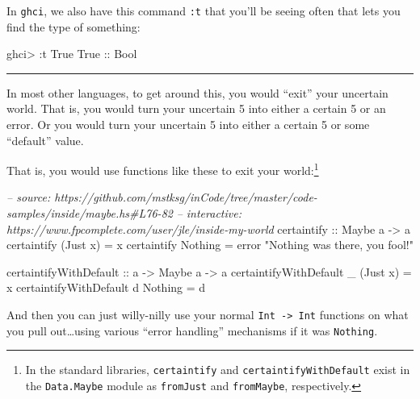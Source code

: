\documentclass[]{article}
\newenvironment{Shaded}{\begin{snugshade}}{\end{snugshade}}
\newcommand{\CommentTok}[1]{\textcolor[rgb]{0.56,0.35,0.01}{\textit{#1}}}
\newcommand{\DataTypeTok}[1]{\textcolor[rgb]{0.13,0.29,0.53}{#1}}
\newcommand{\FunctionTok}[1]{\textcolor[rgb]{0.00,0.00,0.00}{#1}}
\newcommand{\NormalTok}[1]{#1}
\newcommand{\OtherTok}[1]{\textcolor[rgb]{0.56,0.35,0.01}{#1}}
\newcommand{\StringTok}[1]{\textcolor[rgb]{0.31,0.60,0.02}{#1}}
\begin{document}
In \texttt{ghci}, we also have this command \texttt{:t} that you'll be seeing
often that lets you find the type of something:

\begin{Shaded}
\begin{Highlighting}[]
\NormalTok{ghci}\FunctionTok{>} \FunctionTok{:}\NormalTok{t }\DataTypeTok{True}
\DataTypeTok{True}\OtherTok{ ::} \DataTypeTok{Bool}
\end{Highlighting}
\end{Shaded}

\begin{center}\rule{0.5\linewidth}{\linethickness}\end{center}

In most other languages, to get around this, you would ``exit'' your uncertain
world. That is, you would turn your uncertain 5 into either a certain 5 or an
error. Or you would turn your uncertain 5 into either a certain 5 or some
``default'' value.

That is, you would use functions like these to exit your world:\footnote{In the
  standard libraries, \texttt{certaintify} and \texttt{certaintifyWithDefault}
  exist in the \texttt{Data.Maybe} module as \texttt{fromJust} and
  \texttt{fromMaybe}, respectively.}

\begin{Shaded}
\begin{Highlighting}[]
\CommentTok{-- source: https://github.com/mstksg/inCode/tree/master/code-samples/inside/maybe.hs#L76-82}
\CommentTok{-- interactive: https://www.fpcomplete.com/user/jle/inside-my-world}
\OtherTok{certaintify ::} \DataTypeTok{Maybe}\NormalTok{ a }\OtherTok{->}\NormalTok{ a}
\NormalTok{certaintify (}\DataTypeTok{Just}\NormalTok{ x) }\FunctionTok{=}\NormalTok{ x}
\NormalTok{certaintify }\DataTypeTok{Nothing}  \FunctionTok{=}\NormalTok{ error }\StringTok{"Nothing was there, you fool!"}

\OtherTok{certaintifyWithDefault ::}\NormalTok{ a }\OtherTok{->} \DataTypeTok{Maybe}\NormalTok{ a }\OtherTok{->}\NormalTok{ a}
\NormalTok{certaintifyWithDefault _ (}\DataTypeTok{Just}\NormalTok{ x) }\FunctionTok{=}\NormalTok{ x}
\NormalTok{certaintifyWithDefault d }\DataTypeTok{Nothing}  \FunctionTok{=}\NormalTok{ d}
\end{Highlighting}
\end{Shaded}

And then you can just willy-nilly use your normal
\texttt{Int\ -\textgreater{}\ Int} functions on what you pull out\ldots{}using
various ``error handling'' mechanisms if it was \texttt{Nothing}.
\end{document}
